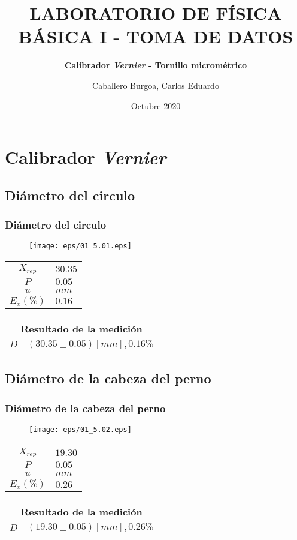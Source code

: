 \documentclass[letter,11pt]{beamer}
\title{\textbf{LABORATORIO DE FÍSICA BÁSICA I - TOMA DE DATOS}}
\subtitle{\textbf{Calibrador \emph{Vernier} - Tornillo micrométrico}}
\author{\small{Caballero Burgoa, Carlos Eduardo}}
\date{\tiny{Octubre 2020}}
\begin{document}
\begin{frame}
\titlepage
\end{frame}

\section{Calibrador \emph{Vernier}}

\subsection{Diámetro del circulo}
\begin{frame}
\frametitle{Diámetro del circulo}
\vspace*{0.8cm}
\begin{figure}
\centering
\texttt{[image: eps/01\_5.01.eps]}
\end{figure}
\vspace*{0.4cm}
\scriptsize
\begin{tabular}{|c|>{\centering}m{1.8cm}<{\centering}|}
\hline
$X_{rep}$ &  $30.35$ \tabularnewline \hline
      $P$ &   $0.05$ \tabularnewline \hline
      $u$ &     $mm$ \tabularnewline \hline
$E_x(\%)$ &   $0.16$ \tabularnewline \hline
\end{tabular}
\quad
\begin{tabular}{|c|>{\centering}m{5.7cm}<{\centering}|}
\hline
\multicolumn{2}{|c|}{\textbf{Resultado de la medición}} \\ \hline
$D$ & $( 30.35\pm0.05)[mm], 0.16\%$ \tabularnewline \hline
\end{tabular}
\end{frame}

\subsection{Diámetro de la cabeza del perno}
\begin{frame}
\frametitle{Diámetro de la cabeza del perno}
\vspace*{0.8cm}
\begin{figure}
\centering
\texttt{[image: eps/01\_5.02.eps]}
\end{figure}
\vspace*{0.4cm}
\scriptsize
\begin{tabular}{|c|>{\centering}m{1.8cm}<{\centering}|}
\hline
$X_{rep}$ &  $19.30$ \tabularnewline \hline
      $P$ &   $0.05$ \tabularnewline \hline
      $u$ &     $mm$ \tabularnewline \hline
$E_x(\%)$ &   $0.26$ \tabularnewline \hline
\end{tabular}
\quad
\begin{tabular}{|c|>{\centering}m{5.7cm}<{\centering}|}
\hline
\multicolumn{2}{|c|}{\textbf{Resultado de la medición}} \\ \hline
$D$ & $( 19.30\pm0.05)[mm], 0.26\%$ \tabularnewline \hline
\end{tabular}
\end{frame}
\end{document}
